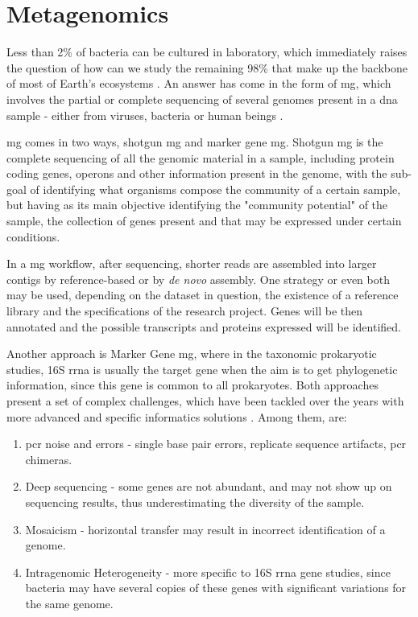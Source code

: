 \documentclass[
  oneside,
  11pt, a4paper,
  footinclude=true,
  headinclude=true,
  cleardoublepage=empty
]{scrbook}
\begin{document}
    \section{Metagenomics}
    
    Less than 2\% of bacteria can be cultured in laboratory, which immediately raises the question of how can we study the remaining 98\% that make up the backbone of most of Earth's ecosystems \citep{IlluminaProprietary}. An answer has come in the form of \gls{mg}, which involves the partial or complete sequencing of several genomes present in a \gls{dna} sample - either from viruses, bacteria or human beings \citep{IlluminaProprietary, Oulas2015, Tringe2005, Thomas2012}.
    
    \gls{mg} comes in two ways, shotgun \gls{mg} and marker gene \gls{mg}. Shotgun \gls{mg} is the complete sequencing of all the genomic material in a sample, including protein coding genes, operons and other information present in the genome, with the sub-goal of identifying what organisms compose the community of a certain sample, but having as its main objective identifying the "community potential" of the sample, the collection of genes present and that may be expressed under certain conditions. 
    
    In a \gls{mg} workflow, after sequencing, shorter reads are assembled into larger contigs by reference-based or by \textit{de novo} assembly. One strategy or even both may be used, depending on the dataset in question, the existence of a reference library and the specifications of the research project. Genes will be then annotated and the possible transcripts and proteins expressed will be identified. 
    
    Another approach is Marker Gene \gls{mg}, where in the taxonomic prokaryotic studies, 16S \gls{rrna} is usually the target gene when the aim is to get phylogenetic information, since this gene is common to all prokaryotes. Both approaches present a set of complex challenges, which have been tackled over the years with more advanced and specific informatics solutions \citep{Oulas2015, Overview2012}. Among them, are: 
    
    \begin{enumerate}
        \item \gls{pcr} noise and errors - single base pair errors, replicate sequence artifacts, \gls{pcr} chimeras.
        \item Deep sequencing - some genes are not abundant, and may not show up on sequencing results, thus underestimating the diversity of the sample.
        \item Mosaicism - horizontal transfer may result in incorrect identification of a genome.
        \item Intragenomic Heterogeneity - more specific to 16S \gls{rrna} gene studies, since bacteria may have several copies of these genes with significant variations for the same genome.
    \end{enumerate}
    
\end{document}
